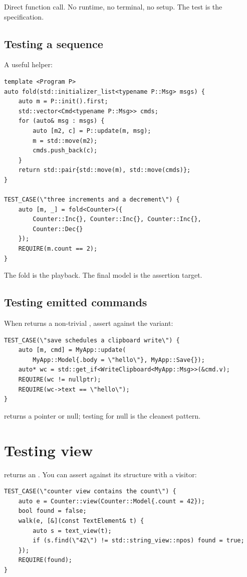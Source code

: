 Direct function call. No runtime, no terminal, no setup. The
test is the specification.

\subsection*{Testing a sequence}

A useful helper:

\begin{lstlisting}
template <Program P>
auto fold(std::initializer_list<typename P::Msg> msgs) {
    auto m = P::init().first;
    std::vector<Cmd<typename P::Msg>> cmds;
    for (auto& msg : msgs) {
        auto [m2, c] = P::update(m, msg);
        m = std::move(m2);
        cmds.push_back(c);
    }
    return std::pair{std::move(m), std::move(cmds)};
}

TEST_CASE(\"three increments and a decrement\") {
    auto [m, _] = fold<Counter>({
        Counter::Inc{}, Counter::Inc{}, Counter::Inc{},
        Counter::Dec{}
    });
    REQUIRE(m.count == 2);
}
\end{lstlisting}

The fold is the playback. The final model is the assertion target.

\subsection*{Testing emitted commands}

When  returns a non-trivial , assert
against the variant:

\begin{lstlisting}
TEST_CASE(\"save schedules a clipboard write\") {
    auto [m, cmd] = MyApp::update(
        MyApp::Model{.body = \"hello\"}, MyApp::Save{});
    auto* wc = std::get_if<WriteClipboard<MyApp::Msg>>(&cmd.v);
    REQUIRE(wc != nullptr);
    REQUIRE(wc->text == \"hello\");
}
\end{lstlisting}

 returns a pointer or null; testing for null
is the cleanest pattern.

\section{Testing view}

 returns an . You can assert against
its structure with a visitor:

\begin{lstlisting}
TEST_CASE(\"counter view contains the count\") {
    auto e = Counter::view(Counter::Model{.count = 42});
    bool found = false;
    walk(e, [&](const TextElement& t) {
        auto s = text_view(t);
        if (s.find(\"42\") != std::string_view::npos) found = true;
    });
    REQUIRE(found);
}
\end{lstlisting}

